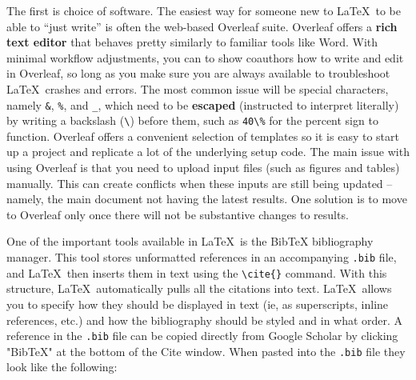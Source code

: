 The first is choice of software. The easiest way
for someone new to \LaTeX\ to be able to ``just write''
is often the web-based Overleaf suite.
Overleaf offers a \textbf{rich text editor}
that behaves pretty similarly to familiar tools like Word.
With minimal workflow adjustments, you can
to show coauthors how to write and edit in Overleaf,
so long as you make sure you are always available to troubleshoot
\LaTeX\ crashes and errors.
The most common issue will be special characters, namely
\texttt{\&}, \texttt{\%}, and \texttt{\_},
which need to be \textbf{escaped} (instructed to interpret literally)
by writing a backslash (\texttt{\textbackslash}) before them,
such as  \texttt{40\textbackslash\%} for the percent sign to function.
Overleaf offers a convenient selection of templates
so it is easy to start up a project
and replicate a lot of the underlying setup code.
The main issue with using Overleaf is that you need to upload input files
(such as figures and tables) manually.
This can create conflicts when these inputs are still being updated --
namely, the main document not having the latest results.
One solution is to move to Overleaf only once there will not be substantive changes to results.

One of the important tools available in \LaTeX\ is the BibTeX bibliography manager.
This tool stores unformatted references
in an accompanying \texttt{.bib} file,
and \LaTeX\ then inserts them in text
using the \texttt{\textbackslash cite\{\}} command.
With this structure, \LaTeX\ automatically pulls
all the citations into text. \LaTeX\ allows you to specify
how they should be displayed in text
(ie, as superscripts, inline references, etc.)
and how the bibliography should be styled and in what order.
A reference in the \texttt{.bib} file
can be copied directly from Google Scholar
by clicking "BibTeX" at the bottom of the Cite window.
When pasted into the \texttt{.bib} file they look like the following:

